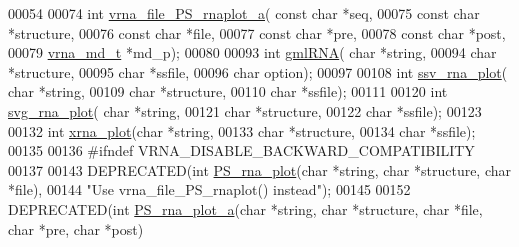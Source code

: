 \begin{DoxyCode}
00054 
00074 \textcolor{keywordtype}{int} \hyperlink{plot__structure_8h_a139a31dd0ba9fc6612431f67de901c31}{vrna\_file\_PS\_rnaplot\_a}( \textcolor{keyword}{const} \textcolor{keywordtype}{char} *seq,
00075                             \textcolor{keyword}{const} \textcolor{keywordtype}{char} *structure,
00076                             \textcolor{keyword}{const} \textcolor{keywordtype}{char} *file,
00077                             \textcolor{keyword}{const} \textcolor{keywordtype}{char} *pre,
00078                             \textcolor{keyword}{const} \textcolor{keywordtype}{char} *post,
00079                             \hyperlink{group__model__details_structvrna__md__s}{vrna\_md\_t}  *md\_p);
00080 
00093 \textcolor{keywordtype}{int} \hyperlink{plot__structure_8h_a70834bc8c0aad4fe6824ff76ccb8f329}{gmlRNA}( \textcolor{keywordtype}{char} *\textcolor{keywordtype}{string},
00094             \textcolor{keywordtype}{char} *structure,
00095             \textcolor{keywordtype}{char} *ssfile,
00096             \textcolor{keywordtype}{char} option);
00097 
00108 \textcolor{keywordtype}{int} \hyperlink{plot__structure_8h_add368528755f9a830727b680243541df}{ssv\_rna\_plot}( \textcolor{keywordtype}{char} *\textcolor{keywordtype}{string},
00109                   \textcolor{keywordtype}{char} *structure,
00110                   \textcolor{keywordtype}{char} *ssfile);
00111 
00120 \textcolor{keywordtype}{int} \hyperlink{plot__structure_8h_ae7853539b5df98f294b4af434e979304}{svg\_rna\_plot}( \textcolor{keywordtype}{char} *\textcolor{keywordtype}{string},
00121                   \textcolor{keywordtype}{char} *structure,
00122                   \textcolor{keywordtype}{char} *ssfile);
00123 
00132 \textcolor{keywordtype}{int} \hyperlink{plot__structure_8h_a2f6d5953e6a323df898896b8d6614483}{xrna\_plot}(\textcolor{keywordtype}{char} *\textcolor{keywordtype}{string},
00133               \textcolor{keywordtype}{char} *structure,
00134               \textcolor{keywordtype}{char} *ssfile);
00135 
00136 \textcolor{preprocessor}{#ifndef VRNA\_DISABLE\_BACKWARD\_COMPATIBILITY}
00137 
00143 DEPRECATED(\textcolor{keywordtype}{int} \hyperlink{plot__structure_8h_a0873c7cc4cd7a11c9a2cea19dde7e9c9}{PS\_rna\_plot}(\textcolor{keywordtype}{char} *\textcolor{keywordtype}{string}, \textcolor{keywordtype}{char} *structure, \textcolor{keywordtype}{char} *file),
00144 \textcolor{stringliteral}{"Use vrna\_file\_PS\_rnaplot() instead"});
00145 
00152 DEPRECATED(\textcolor{keywordtype}{int} \hyperlink{plot__structure_8h_a47856b2504b566588785597b6ebb8271}{PS\_rna\_plot\_a}(\textcolor{keywordtype}{char} *\textcolor{keywordtype}{string}, \textcolor{keywordtype}{char} *structure, \textcolor{keywordtype}{char} *file, \textcolor{keywordtype}{char} *pre, \textcolor{keywordtype}{char} *post)

\end{DoxyCode}
